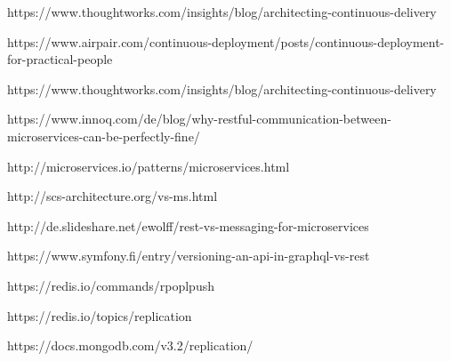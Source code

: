 https://www.thoughtworks.com/insights/blog/architecting-continuous-delivery

https://www.airpair.com/continuous-deployment/posts/continuous-deployment-for-practical-people

https://www.thoughtworks.com/insights/blog/architecting-continuous-delivery

https://www.innoq.com/de/blog/why-restful-communication-between-microservices-can-be-perfectly-fine/

http://microservices.io/patterns/microservices.html

http://scs-architecture.org/vs-ms.html

http://de.slideshare.net/ewolff/rest-vs-messaging-for-microservices

https://www.symfony.fi/entry/versioning-an-api-in-graphql-vs-rest

https://redis.io/commands/rpoplpush

https://redis.io/topics/replication

https://docs.mongodb.com/v3.2/replication/
